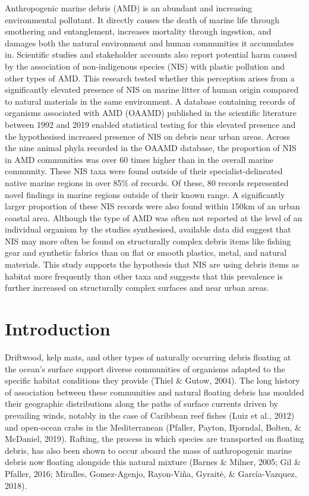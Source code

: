 \documentclass[a4paper, nobind]{templates/ociamthesis}
\begin{document}
Anthropogenic marine debris (AMD) is an abundant and increasing environmental pollutant. It directly causes the death of marine life through smothering and entanglement, increases mortality through ingestion, and damages both the natural environment and human communities it accumulates in. Scientific studies and stakeholder accounts also report potential harm caused by the association of non-indigenous species (NIS) with plastic pollution and other types of AMD. This research tested whether this perception arises from a significantly elevated presence of NIS on marine litter of human origin compared to natural materials in the same environment. A database containing records of organisms associated with AMD (OAAMD) published in the scientific literature between 1992 and 2019 enabled statistical testing for this elevated presence and the hypothesised increased presence of NIS on debris near urban areas. Across the nine animal phyla recorded in the OAAMD database, the proportion of NIS in AMD communities was over 60 times higher than in the overall marine community. These NIS taxa were found outside of their specialist-delineated native marine regions in over 85\% of records. Of these, 80 records represented novel findings in marine regions outside of their known range. A significantly larger proportion of these NIS records were also found within 150km of an urban coastal area. Although the type of AMD was often not reported at the level of an individual organism by the studies synthesised, available data did suggest that NIS may more often be found on structurally complex debris items like fishing gear and synthetic fabrics than on flat or smooth plastics, metal, and natural materials. This study supports the hypothesis that NIS are using debris items as habitat more frequently than other taxa and suggests that this prevalence is further increased on structurally complex surfaces and near urban areas.

\hypertarget{introduction-2}{%
\section{Introduction}\label{introduction-2}}

Driftwood, kelp mats, and other types of naturally occurring debris floating at the ocean's surface support diverse communities of organisms adapted to the specific habitat conditions they provide (Thiel \& Gutow, 2004). The long history of association between these communities and natural floating debris has moulded their geographic distributions along the paths of surface currents driven by prevailing winds, notably in the case of Caribbean reef fishes (Luiz et al., 2012) and open-ocean crabs in the Mediterranean (Pfaller, Payton, Bjorndal, Bolten, \& McDaniel, 2019). Rafting, the process in which species are transported on floating debris, has also been shown to occur aboard the mass of anthropogenic marine debris now floating alongside this natural mixture (Barnes \& Milner, 2005; Gil \& Pfaller, 2016; Miralles, Gomez-Agenjo, Rayon-Viña, Gyraitė, \& García-Vazquez, 2018).
\end{document}
